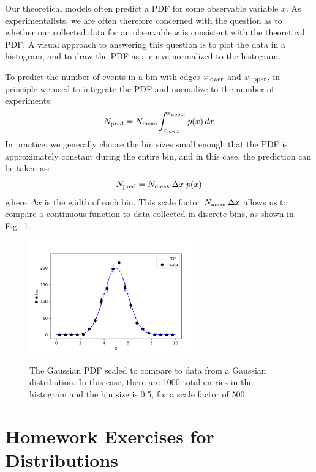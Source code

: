 \documentclass[12pt,oneside]{book}
\begin{document}
Our theoretical models often predict a PDF for some observable variable $x$.  As experimentalists, we are often therefore concerned with the question as to whether our collected data for an observable $x$ is consistent with the theoretical PDF.  A visual approach to answering this question is to plot the data in a histogram, and to draw the PDF as a curve normalized to the histogram.

To predict the number of events in a bin with edges $x_{\rm lower}$ and $x_{\rm upper}$, in principle we need to integrate the PDF and normalize to the number of experiments:
\begin{displaymath}
N_{\rm pred} = N_{\rm meas} \int^{x_{\rm upper}}_{x_{\rm lower}} p(x) \, dx
\end{displaymath}
In practice, we generally choose the bin sizes small enough that the PDF is approximately constant during the entire bin, and in this case, the prediction can be taken as:
\begin{displaymath}
N_{\rm pred} = N_{\rm meas} \; \Delta x \; p(x)
\end{displaymath}
where $\Delta x$ is the width of each bin.  This scale factor $N_{\rm meas} \; \Delta x$ allows us to compare a continuous function to data collected in discrete bins, as shown in Fig.~\ref{fig:histpdf}.

\begin{figure}[htbp]
\begin{center}
{\includegraphics[width=0.65\textwidth]{figs/compare.pdf}}
\end{center}
\caption{\label{fig:histpdf} The Gaussian PDF scaled to compare to data from a Gaussian distribution.
In this case, there are 1000 total entries in the histogram and the bin size is 0.5, for a scale factor of 500.
}
\end{figure}



\newpage
\section{Homework Exercises for Distributions}
\end{document}
